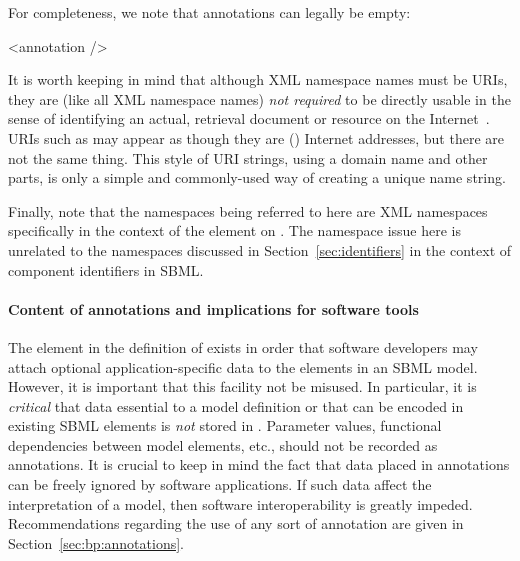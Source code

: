 For completeness, we note that annotations can legally be empty:

\begin{example}
<annotation />
\end{example}

It is worth keeping in mind that although XML namespace names must
be URIs, they are (like all XML namespace names) \emph{not
  required} to be directly usable in the sense of identifying an
actual, retrieval document or resource on the
Internet~\citep{bray:1999}.  URIs such as
 may appear as though they are (\eg)
Internet addresses, but there are not the same thing.  This style
of URI strings, using a domain name and other parts, is only a
simple and commonly-used way of creating a unique name string.

Finally, note that the namespaces being referred to here are XML
namespaces specifically in the context of the 
element on \SBase.  The namespace issue here is unrelated to the
namespaces discussed in Section~\ref{sec:identifiers} in the
context of component identifiers in SBML.


\paragraph{Content of annotations and implications for software tools}

The  element in the definition of \SBase exists in
order that software developers may attach optional
application-specific data to the elements in an SBML model.
However, it is important that this facility not be misused.  In
particular, it is \emph{critical} that data essential to a model
definition or that can be encoded in existing SBML elements is
\emph{not} stored in . Parameter values,
functional dependencies between model elements, etc., should not
be recorded as annotations.  It is crucial to keep in mind the
fact that data placed in annotations can be freely ignored by
software applications.  If such data affect the interpretation of
a model, then software interoperability is greatly impeded.  
Recommendations regarding the use of any sort of annotation are
given in Section~\ref{sec:bp:annotations}.  





%


